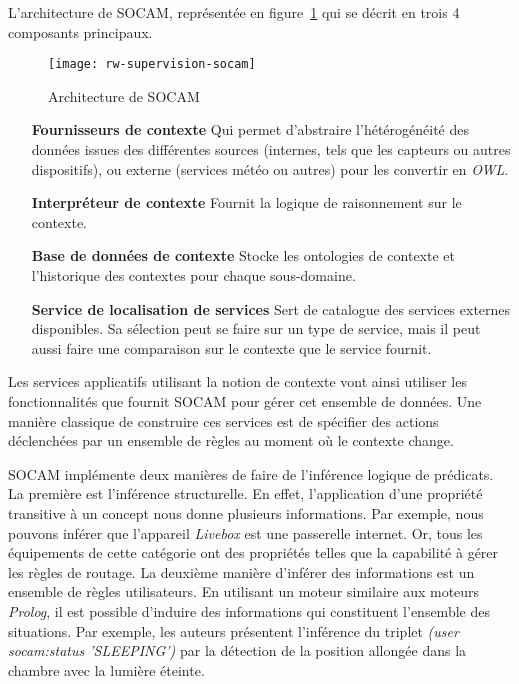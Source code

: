 L'architecture de SOCAM, représentée en figure~\ref{fig:rw:supervision:socam} qui se décrit en trois 4 composants principaux.
\begin{figure}[ht]
    \centering
    \texttt{[image: rw-supervision-socam]}
    \caption{Architecture de SOCAM}\label{fig:rw:supervision:socam}
\end{figure}
\begin{itemize}
	\item[\textbf{Fournisseurs de contexte}] Qui permet d'abstraire l'hétérogénéité des données issues des différentes sources (internes, tels que les capteurs ou autres dispositifs), ou externe (services météo ou autres) pour les convertir en \textit{OWL}.
    \item[\textbf{Interpréteur de contexte}] Fournit la logique de raisonnement sur le contexte.
    \item[\textbf{Base de données de contexte}] Stocke les ontologies de contexte et l'historique des contextes pour chaque sous-domaine.
    \item[\textbf{Service de localisation de services}] Sert de catalogue des services externes disponibles. Sa sélection peut se faire sur un type de service, mais il peut aussi faire une comparaison sur le contexte que le service fournit.
\end{itemize}
Les services applicatifs utilisant la notion de contexte vont ainsi utiliser les fonctionnalités que fournit SOCAM pour gérer cet ensemble de données. Une manière classique de construire ces services est de spécifier des actions déclenchées par un ensemble de règles au moment où le contexte change.

SOCAM implémente deux manières de faire de l'inférence logique de prédicats. La première est l'inférence structurelle. En effet, l'application d'une propriété transitive à un concept nous donne plusieurs informations. Par exemple, nous pouvons inférer que l'appareil \textit{Livebox} est une passerelle internet. Or, tous les équipements de cette catégorie ont des propriétés telles que la capabilité à gérer les règles de routage. La deuxième manière d'inférer des informations est un ensemble de règles utilisateurs. En utilisant un moteur similaire aux moteurs \textit{Prolog}, il est possible d'induire des informations qui constituent l'ensemble des situations. Par exemple, les auteurs présentent l'inférence du triplet \textit{(user socam:status 'SLEEPING')} par la détection de la position allongée dans la chambre avec la lumière éteinte.

